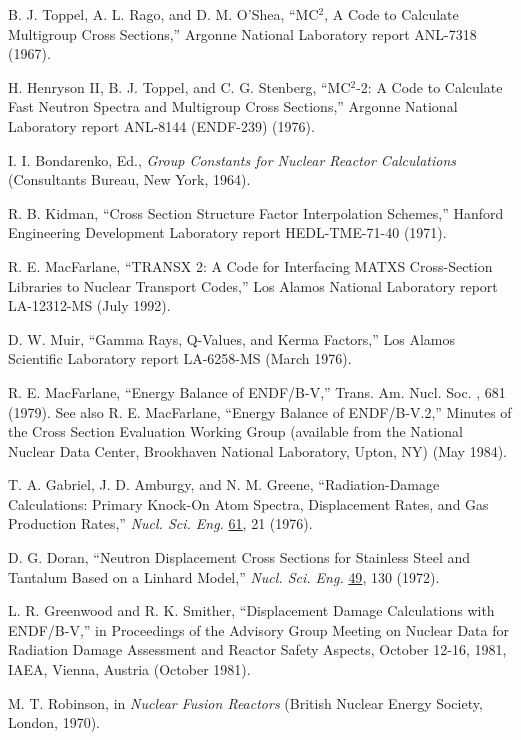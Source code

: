 \documentclass[11pt,twoside]{NJOYMan}
\begin{document}
\begin{thebibliography}{99}
\begin{singlespace}
 B. J. Toppel, A. L. Rago, and D. M. O'Shea,
  ``MC$^2$, A Code to Calculate Multigroup Cross Sections,''
  Argonne National Laboratory report ANL-7318 (1967).

 H. Henryson II, B. J. Toppel, and C. G. Stenberg,
  ``MC$^2$-2: A Code to Calculate Fast Neutron Spectra and Multigroup
  Cross Sections,'' Argonne National Laboratory report ANL-8144
  (ENDF-239) (1976).

 I. I. Bondarenko, Ed., {\it Group Constants for Nuclear
  Reactor Calculations} (Consultants Bureau, New York, 1964).

 R. B. Kidman, ``Cross Section Structure Factor
   Interpolation Schemes,'' Hanford Engineering Development
   Laboratory report HEDL-TME-71-40 (1971).

 R. E. MacFarlane, ``TRANSX 2: A Code for Interfacing
   MATXS Cross-Section Libraries to Nuclear Transport Codes,''
   Los Alamos National Laboratory report LA-12312-MS (July 1992).

 D. W. Muir, ``Gamma Rays, Q-Values, and Kerma Factors,''
   Los Alamos Scientific Laboratory report LA-6258-MS (March 1976).

 R. E. MacFarlane, ``Energy Balance of ENDF/B-V,''
   Trans. Am. Nucl. Soc. , 681 (1979).  See also
   R. E. MacFarlane, ``Energy Balance of ENDF/B-V.2,''
   Minutes of the Cross Section Evaluation Working Group
   (available from the National Nuclear Data Center, Brookhaven
   National Laboratory, Upton, NY) (May 1984).

 T. A. Gabriel, J. D. Amburgy, and N. M. Greene,
   ``Radiation-Damage Calculations: Primary Knock-On Atom Spectra,
   Displacement Rates, and Gas Production Rates,''
   {\it Nucl. Sci. Eng.} \underline{61}, 21 (1976).

 D. G. Doran, ``Neutron Displacement Cross Sections for
   Stainless Steel and Tantalum Based on a Linhard Model,'' {\it Nucl. Sci.
   Eng.} \underline{49}, 130 (1972).

 L. R. Greenwood and R. K. Smither, ``Displacement
   Damage Calculations with ENDF/B-V,'' in Proceedings of the Advisory Group
   Meeting on Nuclear Data for Radiation Damage Assessment and Reactor
   Safety Aspects, October 12-16, 1981, IAEA, Vienna, Austria (October 1981).

 M. T. Robinson, in {\it Nuclear Fusion Reactors}
   (British Nuclear Energy Society, London, 1970).


\end{singlespace}
\end{thebibliography}
\end{document}
